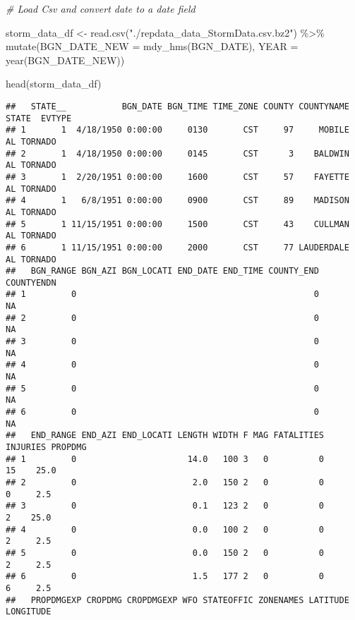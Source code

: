 \documentclass[
]{article}
\newenvironment{Shaded}{\begin{snugshade}}{\end{snugshade}}
\newcommand{\AttributeTok}[1]{\textcolor[rgb]{0.77,0.63,0.00}{#1}}
\newcommand{\CommentTok}[1]{\textcolor[rgb]{0.56,0.35,0.01}{\textit{#1}}}
\newcommand{\FunctionTok}[1]{\textcolor[rgb]{0.00,0.00,0.00}{#1}}
\newcommand{\NormalTok}[1]{#1}
\newcommand{\OtherTok}[1]{\textcolor[rgb]{0.56,0.35,0.01}{#1}}
\newcommand{\SpecialCharTok}[1]{\textcolor[rgb]{0.00,0.00,0.00}{#1}}
\newcommand{\StringTok}[1]{\textcolor[rgb]{0.31,0.60,0.02}{#1}}
\begin{document}
\begin{Shaded}
\begin{Highlighting}[]
\CommentTok{\# Load Csv and convert date to a date field}

\NormalTok{storm\_data\_df }\OtherTok{\textless{}{-}} \FunctionTok{read.csv}\NormalTok{(}\StringTok{"./repdata\_data\_StormData.csv.bz2"}\NormalTok{) }\SpecialCharTok{\%\textgreater{}\%} 
        \FunctionTok{mutate}\NormalTok{(}\AttributeTok{BGN\_DATE\_NEW =} \FunctionTok{mdy\_hms}\NormalTok{(BGN\_DATE), }\AttributeTok{YEAR =} \FunctionTok{year}\NormalTok{(BGN\_DATE\_NEW)) }

\FunctionTok{head}\NormalTok{(storm\_data\_df)}
\end{Highlighting}
\end{Shaded}

\begin{verbatim}
##   STATE__           BGN_DATE BGN_TIME TIME_ZONE COUNTY COUNTYNAME STATE  EVTYPE
## 1       1  4/18/1950 0:00:00     0130       CST     97     MOBILE    AL TORNADO
## 2       1  4/18/1950 0:00:00     0145       CST      3    BALDWIN    AL TORNADO
## 3       1  2/20/1951 0:00:00     1600       CST     57    FAYETTE    AL TORNADO
## 4       1   6/8/1951 0:00:00     0900       CST     89    MADISON    AL TORNADO
## 5       1 11/15/1951 0:00:00     1500       CST     43    CULLMAN    AL TORNADO
## 6       1 11/15/1951 0:00:00     2000       CST     77 LAUDERDALE    AL TORNADO
##   BGN_RANGE BGN_AZI BGN_LOCATI END_DATE END_TIME COUNTY_END COUNTYENDN
## 1         0                                               0         NA
## 2         0                                               0         NA
## 3         0                                               0         NA
## 4         0                                               0         NA
## 5         0                                               0         NA
## 6         0                                               0         NA
##   END_RANGE END_AZI END_LOCATI LENGTH WIDTH F MAG FATALITIES INJURIES PROPDMG
## 1         0                      14.0   100 3   0          0       15    25.0
## 2         0                       2.0   150 2   0          0        0     2.5
## 3         0                       0.1   123 2   0          0        2    25.0
## 4         0                       0.0   100 2   0          0        2     2.5
## 5         0                       0.0   150 2   0          0        2     2.5
## 6         0                       1.5   177 2   0          0        6     2.5
##   PROPDMGEXP CROPDMG CROPDMGEXP WFO STATEOFFIC ZONENAMES LATITUDE LONGITUDE

\end{verbatim}
\end{document}
